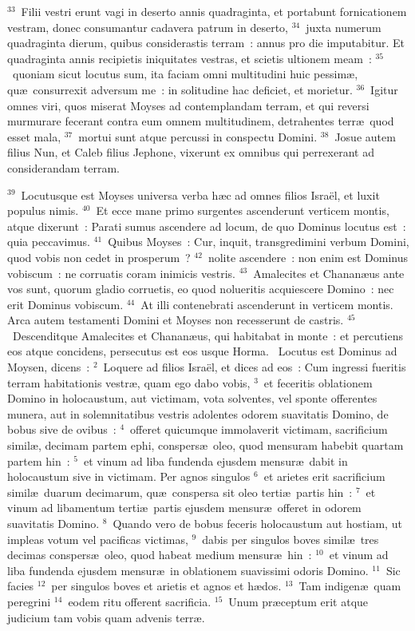 ${}^{33}$~Filii vestri erunt vagi in deserto annis quadraginta, et portabunt fornicationem vestram, donec consumantur cadavera patrum in deserto,
${}^{34}$~juxta numerum quadraginta dierum, quibus considerastis terram~: annus pro die imputabitur. Et quadraginta annis recipietis iniquitates vestras, et scietis ultionem meam~:
${}^{35}$~quoniam sicut locutus sum, ita faciam omni multitudini huic pessim\ae , qu\ae\ consurrexit adversum me~: in solitudine hac deficiet, et morietur.
${}^{36}$~Igitur omnes viri, quos miserat Moyses ad contemplandam terram, et qui reversi murmurare fecerant contra eum omnem multitudinem, detrahentes terr\ae\ quod esset mala,
${}^{37}$~mortui sunt atque percussi in conspectu Domini.
${}^{38}$~Josue autem filius Nun, et Caleb filius Jephone, vixerunt ex omnibus qui perrexerant ad considerandam terram.


${}^{39}$~Locutusque est Moyses universa verba h\ae c ad omnes filios Isra\"el, et luxit populus nimis.
${}^{40}$~Et ecce mane primo surgentes ascenderunt verticem montis, atque dixerunt~: Parati sumus ascendere ad locum, de quo Dominus locutus est~: quia peccavimus.
${}^{41}$~Quibus Moyses~: Cur, inquit, transgredimini verbum Domini, quod vobis non cedet in prosperum~?
${}^{42}$~nolite ascendere~: non enim est Dominus vobiscum~: ne corruatis coram inimicis vestris.
${}^{43}$~Amalecites et Chanan\ae us ante vos sunt, quorum gladio corruetis, eo quod nolueritis acquiescere Domino~: nec erit Dominus vobiscum.
${}^{44}$~At illi contenebrati ascenderunt in verticem montis. Arca autem testamenti Domini et Moyses non recesserunt de castris.
${}^{45}$~Descenditque Amalecites et Chanan\ae us, qui habitabat in monte~: et percutiens eos atque concidens, persecutus est eos usque Horma.
~Locutus est Dominus ad Moysen, dicens~:
${}^{2}$~Loquere ad filios Isra\"el, et dices ad eos~: Cum ingressi fueritis terram habitationis vestr\ae , quam ego dabo vobis,
${}^{3}$~et feceritis oblationem Domino in holocaustum, aut victimam, vota solventes, vel sponte offerentes munera, aut in solemnitatibus vestris adolentes odorem suavitatis Domino, de bobus sive de ovibus~:
${}^{4}$~offeret quicumque immolaverit victimam, sacrificium simil\ae , decimam partem ephi, conspers\ae\ oleo, quod mensuram habebit quartam partem hin~:
${}^{5}$~et vinum ad liba fundenda ejusdem mensur\ae\ dabit in holocaustum sive in victimam. Per agnos singulos
${}^{6}$~et arietes erit sacrificium simil\ae\ duarum decimarum, qu\ae\ conspersa sit oleo terti\ae\ partis hin~:
${}^{7}$~et vinum ad libamentum terti\ae\ partis ejusdem mensur\ae\ offeret in odorem suavitatis Domino.
${}^{8}$~Quando vero de bobus feceris holocaustum aut hostiam, ut impleas votum vel pacificas victimas,
${}^{9}$~dabis per singulos boves simil\ae\ tres decimas conspers\ae\ oleo, quod habeat medium mensur\ae\ hin~:
${}^{10}$~et vinum ad liba fundenda ejusdem mensur\ae\ in oblationem suavissimi odoris Domino.
${}^{11}$~Sic facies
${}^{12}$~per singulos boves et arietis et agnos et h\ae dos.
${}^{13}$~Tam indigen\ae\ quam peregrini
${}^{14}$~eodem ritu offerent sacrificia.
${}^{15}$~Unum pr\ae ceptum erit atque judicium tam vobis quam advenis terr\ae .


